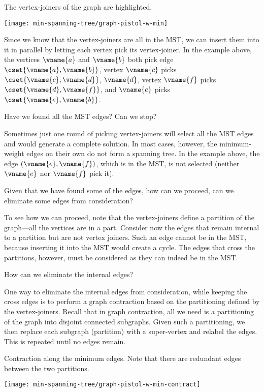 \begin{example}
  The vertex-joiners of the graph are highlighted.  
\begin{center}
 \texttt{[image: min-spanning-tree/graph-pistol-w-min]}
\end{center}
\end{example}

Since we know that the vertex-joiners are all in the MST, we can
insert them into it in parallel by letting each vertex pick its
vertex-joiner.
%
In the example above, the vertices $\vname{a}$ and $\vname{b}$ both
pick edge $\cset{\vname{a},\vname{b}}$, 
%
vertex $\vname{c}$ picks $\cset{\vname{c},\vname{d}}$, $\vname{d}$,
%
vertex $\vname{f}$ picks $\cset{\vname{d},\vname{f}}$, 
%
and $\vname{e}$ picks $\cset{\vname{e},\vname{b}}$.

\begin{question}
Have we found all the MST edges?  Can we stop? 
\end{question}
Sometimes just one round of picking vertex-joiners will select all the
MST edges and would generate a complete solution.  
%
In most cases, however, the minimum-weight edges on their own do not
form a spanning tree.  
%
In the example above, the edge
$(\vname{e},\vname{f})$, which is in the MST, is not selected (neither
$\vname{e}$ nor $\vname{f}$ pick it).
\begin{question}
Given that we have found some of the edges, how can we proceed, can we
eliminate some edges from consideration?
\end{question}
To see how we can proceed, note that the vertex-joiners define a
partition of the graph---all the vertices are in a part.
%
Consider now the edges that remain internal to a partition but are not
vertex joiners.  
%
Such an edge cannot be in the MST, because inserting it into the MST
would create a cycle.
%
The edges that cross the partitions, however, must be considered as
they can indeed be in the MST.
%

\begin{question}
How can we eliminate the internal edges?
\end{question}
One way to eliminate the internal edges from consideration, while
keeping the cross edges is to perform a graph contraction based on the
partitioning defined by the vertex-joiners. Recall that in graph
contraction, all we need is a partitioning of the graph into disjoint
connected subgraphs.  Given such a partitioning, we then replace each
subgraph (partition) with a super-vertex and relabel the edges.  This
is repeated until no edges remain.
\begin{example}
      Contraction along the minimum edges.   Note that there are
      redundant edges between the two partitions.
\begin{center}
\texttt{[image: min-spanning-tree/graph-pistol-w-min-contract]}
\hspace{1in}
\end{center}
\end{example}

